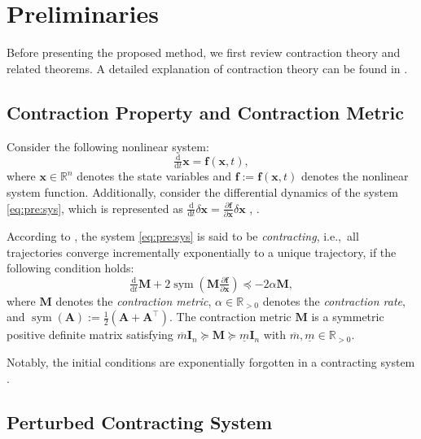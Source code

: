 \documentclass{ifacconf}
\newcommand\ie{\textrm{i.e.,\ }}
\newcommand\R{\mathbb{R}}
\newcommand*{\mv}[1]{\boldsymbol{#1}} %
\newcommand*{\mm}[1]{\boldsymbol{#1}} %
\DeclareMathOperator{\mysym}{{sym}}       %
\newcommand\der{\mathrm d}
\newcommand*{\ddtt}{
   \tfrac{\der}{\der t}
}
\newcommand*{\pptfrac}[2]{
   \tfrac{\partial {#1}}{\partial {#2}}
}
\begin{document}
\section{Preliminaries} \label{sec:preliminaries}

Before presenting the proposed method, we first review contraction theory and related theorems.
A detailed explanation of contraction theory can be found in \cite{LOHMILLER:1998aa,Manchester:2017aa,Tsukamoto:2021aa}.

\subsection{Contraction Property and Contraction Metric} \label{sec:sub:contraction}

Consider the following nonlinear system:
\begin{equation} \label{eq:pre:sys}
   \ddtt\mv{x}
   =
   \mv{f}(\mv{x},t)
   ,
\end{equation}
where $\mv{x}\in\R^n$ denotes the state variables and $\mv{f}:=\mv{f}(\mv{x},t)$ denotes the nonlinear system function.
Additionally, consider the differential dynamics of the system \eqref{eq:pre:sys}, which is represented as 
$
   \ddtt{\delta\mv{x}}
   =
   \pptfrac{\mv{f}}{\mv{x}} \delta\mv{x}
$
, \cite[Chap 4]{Kirk:2004aa}.

According to \cite{LOHMILLER:1998aa}, the system \eqref{eq:pre:sys} is said to be \textit{contracting}, \ie all trajectories converge incrementally exponentially to a unique trajectory, if the following condition holds:
\begin{equation} \label{eq:pre:contraction:condition}
   \ddtt\mm{M} 
   + 
   2\mysym
   \left(
      \mm{M} \pptfrac{\mv{f}}{\mv{x}}
   \right) 
   \preceq 
   -2\alpha\mm{M}
   ,
\end{equation}
where $\mm{M}$ denotes the \textit{contraction metric}, $\alpha\in\R_{>0}$ denotes the \textit{contraction rate}, and $\mysym(\mm A):=\tfrac{1}{2}(\mm A+\mm A^\top)$.
The contraction metric $\mm{M}$ is a symmetric positive definite matrix satisfying $\overline{m}\mm{I}_n\succeq\mm{M}\succeq\underline{m}\mm{I}_n$ with $\overline{m},\underline{m}\in\R_{>0}$.

Notably, the initial conditions are exponentially forgotten in a contracting system \cite{LOHMILLER:1998aa}.

\subsection{Perturbed Contracting System} \label{sec:sub:contraction:perturbed}
\end{document}

